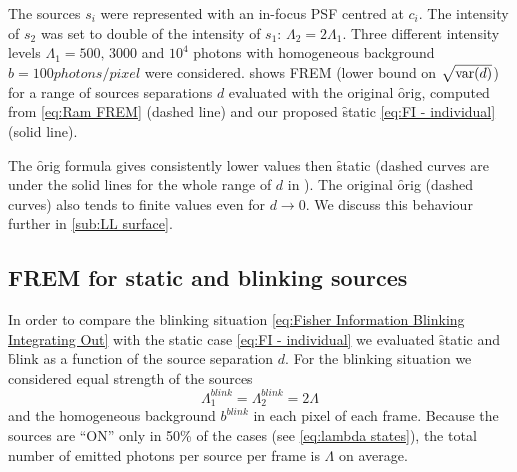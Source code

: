 The sources $s_i$ were represented with an in-focus PSF centred at $c_i$. The intensity of $s_2$ was set to double of the intensity of $s_1$: $\Lambda_2=2\Lambda_1$. Three different intensity levels $\Lambda_1=500,\,3000$ and $10^4$ photons with homogeneous background $b=100\unit{photons/pixel}$ were considered.  shows FREM (lower bound on $\sqrt{\mathrm{var}(d)}$) for a range of sources separations $d$ evaluated with the original \f{orig}, computed from \autoref{eq:Ram FREM} (dashed line) and our proposed \f{static} \autoref{eq:FI - individual} (solid line).

The \f{orig} formula gives consistently lower values then \f{static} (dashed curves are under the solid lines for the whole range of $d$ in ). The original \f{orig} (dashed curves) also tends to finite values even for $d\rightarrow 0$. We discuss this behaviour further in \autoref{sub:LL surface}. 


\subsection{FREM for static and blinking sources\label{sub:FREM static vs blinking}}
%
In order to compare the blinking situation \autoref{eq:Fisher Information Blinking Integrating Out} with the static case \autoref{eq:FI - individual} we evaluated \f{static} and \f{blink} as a function of the source separation $d$. For the blinking situation we considered equal strength of the sources
%
\begin{equation}
	\Lambda_1^{blink}=\Lambda_2^{blink}=2\Lambda
\end{equation}
%
and the homogeneous background $b^{blink}$ in each pixel of each frame. Because the sources are ``ON'' only in 50\% of the cases (see \autoref{eq:lambda states}), the total number of emitted photons per source per frame is $\Lambda$ on average. 

